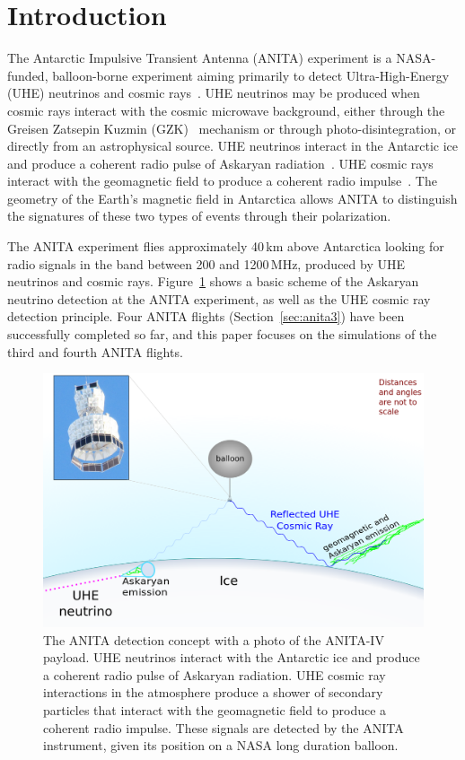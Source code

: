 \section{Introduction}
The Antarctic Impulsive Transient Antenna (ANITA) experiment is a NASA-funded, balloon-borne experiment aiming primarily to detect Ultra-High-Energy (UHE) neutrinos and cosmic rays~\cite{ANITA1detector,ANITA1paper,ANITA2paper,ANITA2erratum}.
UHE neutrinos may be produced when cosmic rays interact with the
cosmic microwave background, either through the Greisen Zatsepin
Kuzmin (GZK)~\cite{greisen1966end,zatsepin1966gt} mechanism or through photo-disintegration, or directly from an astrophysical source.
UHE neutrinos interact in the Antarctic ice and produce a coherent radio pulse of Askaryan radiation~\cite{askaryan}. UHE cosmic rays interact with the geomagnetic field to produce a coherent radio impulse~\cite{ANITA1UHECR}. The geometry of the Earth's magnetic field in Antarctica allows ANITA to distinguish the signatures of these two types of events through their polarization.

The ANITA experiment flies approximately 40\,km above Antarctica looking for radio signals in the band between 200 and 1200\,MHz, produced by UHE neutrinos and cosmic rays.
Figure~\ref{fig:intro_ANITAconcept} shows a basic scheme of the
Askaryan neutrino detection at the ANITA experiment, as well as the UHE cosmic ray detection principle.
Four ANITA flights (Section~\ref{sec:anita3}) have been successfully completed so far, and this paper focuses on the simulations of the third and fourth ANITA flights.

\begin{figure}[!h]\centering
  \includegraphics[width=.8\linewidth]{./Figs/ANITA_scheme_icemcpaper.png}
  \caption{The ANITA detection concept with a photo of the ANITA-IV payload. UHE neutrinos interact with the Antarctic ice and produce a coherent radio pulse of Askaryan radiation. UHE cosmic ray interactions in the atmosphere produce a shower of secondary particles that interact with the geomagnetic field to produce a coherent radio impulse. These signals are detected by the ANITA instrument, given its position on a NASA long duration balloon. %
  }
  \label{fig:intro_ANITAconcept}
\end{figure}



